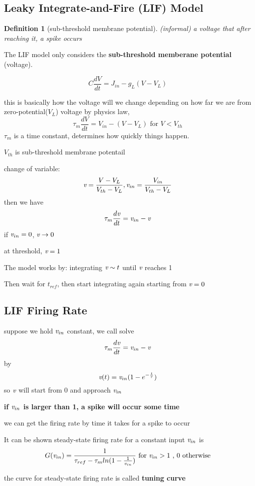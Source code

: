 \documentclass[10pt]{article}
\theoremstyle{break}
\newtheorem{defn}{Definition}[subsection]
\begin{document}
\subsection{Leaky Integrate-and-Fire (LIF) Model}
\begin{defn}[sub-threshold membrane potential]
    (informal) a voltage that after reaching it, a spike occurs
\end{defn}
The LIF model only considers the \textbf{sub-threshold memberane potential} (voltage).

$$C\frac{dV}{dt}=J_{in}-g_L(V-V_L)$$

this is basically how the voltage will we change depending on how far we are from zero-potential($V_L $) voltage
by physics law,
$$\tau_m\frac{dV}{dt}=V_{in}-(V-V_L)\text{   for } V<V_{th}$$
$\tau_m$ is a time constant, determines how quickly things happen.

$V_{th}$ is sub-threshold membrane potentail

change of variable:
$$\emph{v}=\frac{V-V_L}{V_{th}-V_L},\emph{v}_{in}=\frac{V_{in}}{V_{th}-V_L}$$
then we have $$\tau_m\frac{d\emph{v}}{dt}=\emph{v}_{in}-\emph{v}$$
if $\emph{v}_{in}=0$, $\emph{v} \rightarrow 0$

at threshold, $\emph{v}=1$

The model works by: integrating $\emph{v}\sim t$ until $\emph{v}$ reaches 1

Then wait for $t_{ref}$, then start integrating again starting from $\emph{v}=0$

\subsection{LIF Firing Rate}
suppose we hold $\emph{v}_{in}$ constant, we call solve
$$\tau_m\frac{d\emph{v}}{dt}=\emph{v}_{in}-\emph{v}$$
by $$\emph{v}(t)=\emph{v}_{in}(1-e^{-\frac{t}{\tau}})$$
so $\emph{v}$ will start from 0 and approach $\emph{v}_{in}$

\textbf{
if $\emph{v}_{in}$ is larger than 1, a spike will occur some time}

we can get the firing rate by time it takes for a spike to occur

It can be shown steady-state firing rate for a constant input $\emph{v}_{in}$ is 
$$G(\emph{v}_{in})=\frac{1}{\tau_{ref}-\tau_mln(1-\frac{1}{\emph{v}_{in}})} \text{   for } \emph{v}_{in}>1\text{   , 0 otherwise}$$ 

the curve for steady-state firing rate is called \textbf{tuning curve}
\end{document}
